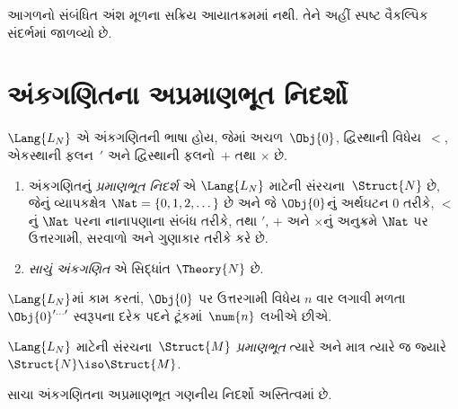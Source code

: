 \OLEndChapterHook


\begin{editorial}
આગળનો સંબંધિત અંશ મૂળના સક્રિય આયાતક્રમમાં નથી. તેને અહીં સ્પષ્ટ વૈકલ્પિક સંદર્ભમાં જાળવ્યો છે.
\end{editorial}
\begingroup
\makeatletter{}\makeatother

\section{અંકગણિતના અપ્રમાણભૂત નિદર્શો}
\label{guunit:OLP-0653}


\begin{defn}
$\Lang{L_N}$ એ અંકગણિતની ભાષા હોય,
જેમાં અચળ~$\Obj{0}$, દ્વિસ્થાની
વિધેય~$<$, એકસ્થાની ફલન~$\prime$
અને દ્વિસ્થાની ફલનો~$+$ તથા $\times$
છે.
\begin{enumerate}
\item અંકગણિતનું \emph{પ્રમાણભૂત નિદર્શ}
  એ $\Lang{L_N}$ માટેની સંરચના~$\Struct{N}$
  છે, જેનું વ્યાપકક્ષેત્ર
  $\Nat = \{ 0, 1, 2, \dots\}$ છે અને જે
  $\Obj{0}$નું અર્થઘટન $0$ તરીકે, $<$નું
  $\Nat$ પરના નાનાપણાના સંબંધ તરીકે,
  તથા $\prime$, $+$ અને $\times$નું
  અનુક્રમે $\Nat$ પર ઉત્તરગામી,
  સરવાળો અને ગુણાકાર તરીકે કરે છે.
\item \emph{સાચું અંકગણિત} એ
  સિદ્ધાંત $\Theory{N}$ છે.
\end{enumerate}
\end{defn}

$\Lang{L_N}$માં કામ કરતાં, $\Obj{0}$ પર
ઉત્તરગામી વિધેય $n$ વાર લગાવી મળતા
$\Obj{0}^{\prime\dots\prime}$
સ્વરૂપના દરેક પદને ટૂંકમાં~$\num{n}$
લખીએ છીએ.

\begin{defn}
$\Lang{L_N}$ માટેની સંરચના~$\Struct{M}$
\emph{પ્રમાણભૂત} ત્યારે અને માત્ર ત્યારે
જ જ્યારે $\Struct{N} \iso \Struct{M}$.
\end{defn}

\begin{thm}
સાચા અંકગણિતના અપ્રમાણભૂત
ગણનીય નિદર્શો અસ્તિત્વમાં છે.
\end{thm}

